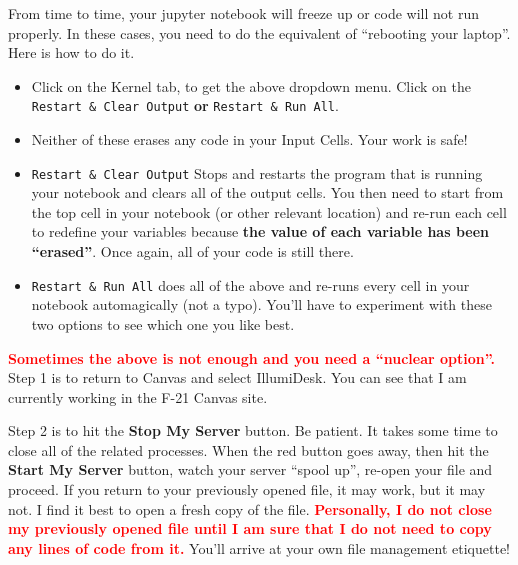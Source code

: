 From time to time, your jupyter notebook will freeze up or code will not run properly. In these cases, you need to do the equivalent of ``rebooting your laptop''. Here is how to do it. \\


\setlength{\fboxrule}{3pt}%
	\centerline{ %
}


\begin{itemize}
    \item Click on the Kernel tab, to get the above dropdown menu. Click on the \texttt{Restart \& Clear Output} \textbf{or} \texttt{Restart \& Run All}.
    \item Neither of these erases any code in your Input Cells. Your work is safe! 
    \item \texttt{Restart \& Clear Output} Stops and restarts the program that is running your notebook and clears all of the output cells. You then need to start from the top cell in your notebook (or other relevant location) and re-run each cell to redefine your variables because \textbf{the value of each variable has been ``erased''}. Once again, all of your code is still there. 
    \item \texttt{Restart \& Run All} does all of the above and re-runs every cell in your notebook automagically (not a typo). You'll have to experiment with these two options to see which one you like best. 
\end{itemize}

\textcolor{red}{\bf Sometimes the above is not enough and you need a ``nuclear option''.} Step 1 is to return to Canvas and select IllumiDesk. You can see that I am currently working in the F-21 Canvas site.\\

\setlength{\fboxrule}{3pt}%
	\centerline{ %
}
\vspace*{.2cm}

Step 2 is to hit the \textbf{Stop My Server} button. Be patient. It takes some time to close all of the related processes. When the red button goes away, then hit the \textbf{Start My Server} button, watch your server ``spool up'', re-open your file and proceed. If you return to your previously opened file, it may work, but it may not. I find it best to open a fresh copy of the file. \textcolor{red}{\bf Personally, I do not close my previously opened file until I am sure that I do not need to copy any lines of code from it.} You'll arrive at your own file management etiquette!\\

